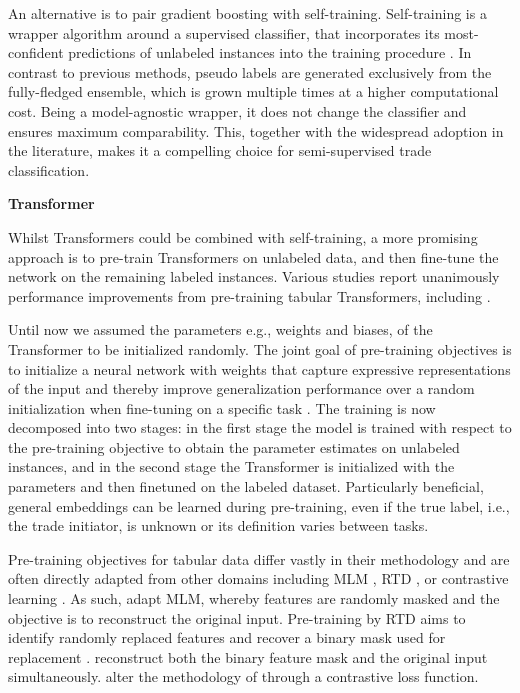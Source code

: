 An alternative is to pair gradient boosting with self-training. Self-training is a wrapper algorithm around a supervised classifier, that incorporates its most-confident predictions of unlabeled instances into the training procedure \autocite[][190]{yarowskyUnsupervisedWordSense1995}. In contrast to previous methods, pseudo labels are generated exclusively from the fully-fledged ensemble, which is grown multiple times at a higher computational cost. Being a model-agnostic wrapper, it does not change the classifier and ensures maximum comparability. This, together with the widespread adoption in the literature, makes it a compelling choice for semi-supervised trade classification.

\textbf{Transformer}

Whilst Transformers could be combined with self-training, a more promising approach is to pre-train Transformers on unlabeled data, and then fine-tune the network on the remaining labeled instances. Various studies report unanimously performance improvements from pre-training tabular Transformers, including \textcites[][8]{somepalliSaintImprovedNeural2021}[][7--8]{huangTabTransformerTabularData2020}.

Until now we assumed the parameters e.g., weights and biases, of the Transformer to be initialized randomly. The joint goal of pre-training objectives is to initialize a neural network with weights that capture expressive representations of the input and thereby improve generalization performance over a random initialization when fine-tuning on a specific task \autocite[][636]{erhanWhyDoesUnsupervised}. The training is now decomposed into two stages: in the first stage the model is trained with respect to the pre-training objective to obtain the parameter estimates on unlabeled instances, and in the second stage the Transformer is initialized with the parameters and then finetuned on the labeled dataset. Particularly beneficial, general embeddings can be learned during pre-training, even if the true label, i.e., the trade initiator, is unknown or its definition varies between tasks.

Pre-training objectives for tabular data differ vastly in their methodology and are often directly adapted from other domains including \gls{MLM} \autocite[][4174]{devlinBERTPretrainingDeep2019}, \gls{RTD} \autocite[][2--3]{clarkElectraPretrainingText2020}, or contrastive learning \autocite[][1598]{chenSimpleFrameworkContrastive2020}.
As such, \textcite[][7]{huangTabTransformerTabularData2020} adapt \gls{MLM}, whereby features are randomly masked and the objective is to reconstruct the original input. Pre-training by \gls{RTD} aims to identify randomly replaced features and recover a binary mask used for replacement \autocite[][7]{huangTabTransformerTabularData2020}. \textcites[][3--4]{bahriSCARFSelfsupervisedContrastive2022}[][11036--11037]{yoonVIMEExtendingSuccess2020} reconstruct both the binary feature mask and the original input simultaneously. \textcite[][3]{somepalliSaintImprovedNeural2021} alter the methodology of \textcite[][11036--11037]{yoonVIMEExtendingSuccess2020} through a contrastive loss function.

